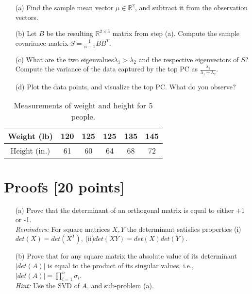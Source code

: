 	\begin{itemize}
		
	\item[(a)] 	 Find the sample mean vector $\mu \in \mathbb{R}^2$, and subtract it from the observation vectors. 
	
	\item[(b)] Let $B$ be the resulting $\mathbb{R}^{2 \times 5}$ matrix from step (a). Compute the sample covariance matrix $S=\frac{1}{n-1}BB^T$. 
	
	\item[(c)] What are the two eigenvalues$\lambda_1 > \lambda_2$ and the respective eigenvectors of $S$? Compute the variance of the data captured by the top PC as $\frac{\lambda_1}{\lambda_1+\lambda_2}$.  
	
	\item[(d)] Plot the data points, and visualize the top PC. What do you observe? 

\end{itemize}


\begin{table}[!h]
	\centering
	\begin{tabular}{|c|ccccc|} \hline
		Weight (lb) & 120 & 125 & 125 & 135 & 145 \\  \hline
		Height (in.)  & 61 & 60 & 64 & 68 & 72 \\ \hline
	\end{tabular}
	\caption{\label{tab:data} Measurements of weight and height for 5 people.}
\end{table}

\section{ Proofs [20 points]}    
\begin{itemize}


	\item[(a)] 	Prove that the determinant of an orthogonal matrix is equal to either +1 or -1.  \\
		{\it Reminders: }  For square matrices $X,Y$ the determinant satisfies properties (i)$det(X)=det(X^T)$, (ii)$det(XY)=det(X)det(Y)$.
	
	 
	\item[(b)] Prove that for any square matrix the absolute value of its determinant$|det(A)|$ is equal to the product of its singular values, i.e., $|det(A)|=\prod_{i=1}^n \sigma_i$.  \\
	
	{\it Hint: } Use the SVD of $A$, and sub-problem (a).
	 
	
\end{itemize}
   
